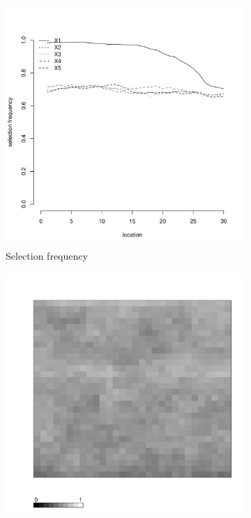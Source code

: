 \documentclass[authoryear, review, 11pt]{elsarticle}
\begin{document}
\begin{figure}
\begin{subfigure}[b]{0.45\textwidth}
		\includegraphics[width=\textwidth]{../../figures/simulation/15.6.profile_selection.pdf}
		\caption{Selection frequency}
	\end{subfigure}
	\begin{subfigure}[b]{0.45\textwidth}
	\centering
		\includegraphics[width=\textwidth]{../../figures/simulation/X1.15.6.unshrunk_bootstrap_coverage.pdf}

\end{subfigure}
\end{figure}
\end{document}
